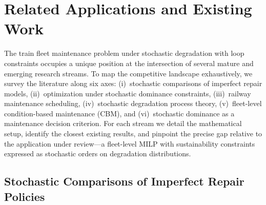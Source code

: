 \documentclass[11pt,a4paper]{article}
\theoremstyle{plain}
\theoremstyle{definition}
\theoremstyle{remark}
\begin{document}
\newpage


\section{Related Applications and Existing Work}
\label{sec:related}

The train fleet maintenance problem under stochastic degradation with loop constraints occupies a unique position at the intersection of several mature and emerging research streams. To map the competitive landscape exhaustively, we survey the literature along six axes: (i)~stochastic comparisons of imperfect repair models, (ii)~optimization under stochastic dominance constraints, (iii)~railway maintenance scheduling, (iv)~stochastic degradation process theory, (v)~fleet-level condition-based maintenance (CBM), and (vi)~stochastic dominance as a maintenance decision criterion. For each stream we detail the mathematical setup, identify the closest existing results, and pinpoint the precise gap relative to the application under review---a fleet-level MILP with sustainability constraints expressed as stochastic orders on degradation distributions.

\subsection{Stochastic Comparisons of Imperfect Repair Policies}
\label{sec:related:s1}
\end{document}
